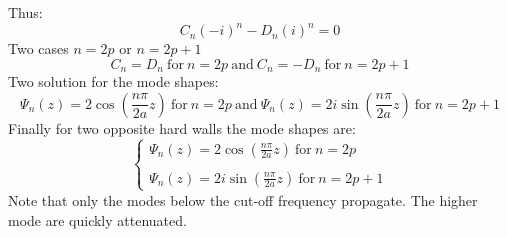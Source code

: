 Thus:
\begin{equation}
    C_n(-i)^{n}-D_n(i)^{n}=0
\end{equation}
Two cases $n=2p$ or $n=2p+1$
\begin{equation}
    C_n=D_n \ \text{for} \ n=2p \ \text{and} \ C_n=-D_n\ \text{for} \ n=2p+1 
\end{equation}
Two solution for the mode shapes:
\begin{equation}
    \Psi_{n}(z)=2\cos(\frac{n\pi}{2a}z) \ \text{for} \ n=2p \ \text{and} \ \Psi_{n}(z)=2i\sin(\frac{n\pi}{2a}z)\ \text{for} \ n=2p+1 
\end{equation}
Finally for two opposite hard walls the mode shapes are: 
\begin{equation}
    \left\{
    \begin{array}{ll}
    \Psi_{n}(z)=2\cos(\frac{n\pi}{2a}z)\ \text{for} \ n=2p \\
        \\
    \Psi_{n}(z)=2i\sin(\frac{n\pi}{2a}z) \ \text{for} \ n=2p+1
    \end{array}
    \right.
\end{equation}
Note that only the modes below the cut-off frequency propagate. The higher mode are quickly attenuated. 
